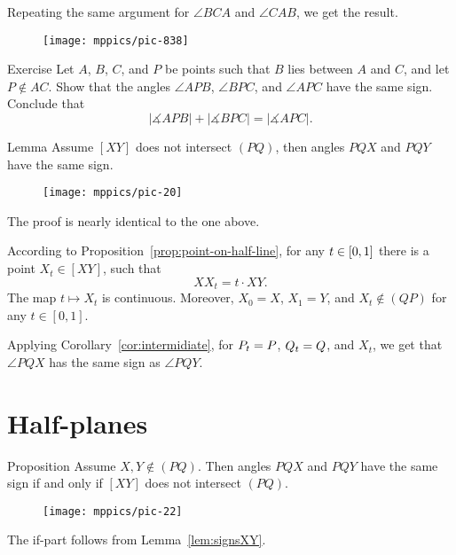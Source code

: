 Repeating the same argument for $\angle BCA$ and $\angle CAB$,
we get the result.
\qeds

\begin{wrapfigure}{r}{26mm}
\vskip-2mm
\centering
\texttt{[image: mppics/pic-838]}
\end{wrapfigure}

\begin{thm}{Exercise}\label{ex:between}
Let $A$, $B$, $C$, and $P$ be points such that $B$ lies between $A$ and $C$, and let $P \not\in AC$.
Show that the angles $\angle APB$, $\angle BPC$, and $\angle APC$ have the same sign.
Conclude that
\[|\measuredangle APB|+|\measuredangle BPC|=|\measuredangle APC|.\]
\end{thm}

\begin{thm}[\abs]{Lemma}\label{lem:signsXY}
Assume $[XY]$ does not intersect $(PQ)$,
then angles $PQX$ and $PQY$ 
have the same sign.
\end{thm}

\begin{wrapfigure}{o}{26mm}
\vskip-4mm
\centering
\texttt{[image: mppics/pic-20]}
\end{wrapfigure}

The proof is nearly identical to the one above.

According to Proposition~\ref{prop:point-on-half-line},
for any $t\in [0,1]$ there is a point  $X_t\in[XY]$, 
such that 
\[XX_t= t\cdot XY.\]
The map $t\mapsto X_t$ is continuous.
Moreover, $X_0=X$, $X_1=Y$, and $X_t\notin(QP)$ for any $t\in [0,1]$.

Applying Corollary~\ref{cor:intermidiate},
for $P_t=P$, $Q_t=Q$, and $X_t$, we get that
$\angle PQX$ has the same sign as $\angle PQY$.
\qeds

\section{Half-planes}

\begin{thm}{Proposition}\label{prop:half-plane}
Assume $X,Y\notin(PQ)$.
Then angles $PQX$ and $PQY$ have the same sign if and only if $[XY]$ does not intersect $(PQ)$.
\end{thm}

\begin{wrapfigure}{o}{30mm}
\texttt{[image: mppics/pic-22]}
\centering
\end{wrapfigure}

 The if-part follows from Lemma~\ref{lem:signsXY}. 

